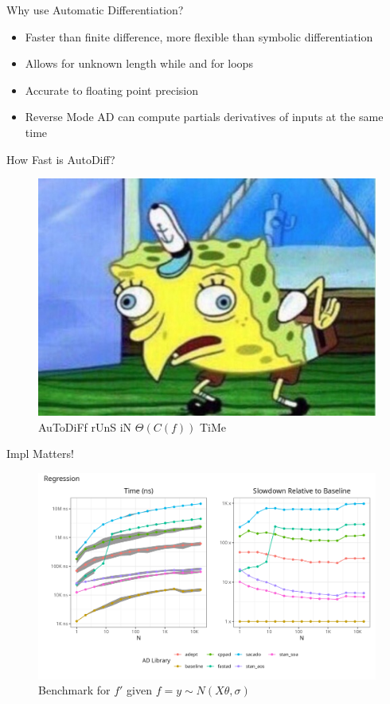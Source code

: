 \documentclass[dvipsnames]{beamer}
\begin{document}
\begin{frame}{Why use Automatic Differentiation?}
\begin{itemize}
\item Faster than finite difference, more flexible than symbolic differentiation
\item Allows for unknown length while and for loops
\item Accurate to floating point precision
\item Reverse Mode AD can compute partials derivatives of inputs at the same time
\end{itemize}
\end{frame}

\begin{frame}{How Fast is AutoDiff?}
\begin{figure}
\centerline{\includegraphics[scale=.5]{img/mocking-spongebob.jpg}}
\caption{AuToDiFf rUnS iN $\Theta(C(f))$ TiMe}
\label{fig-spongebob}
\end{figure}
\end{frame}

\begin{frame}{Impl Matters!}
\begin{figure}
\centerline{\includegraphics[scale=.5]{img/combined_regression_plot.png}}
\caption{Benchmark for $f'$ given $f = y\sim N(X\theta,\sigma)$}
\label{fig-red-bench}
\end{figure}
\end{frame}
\end{document}
